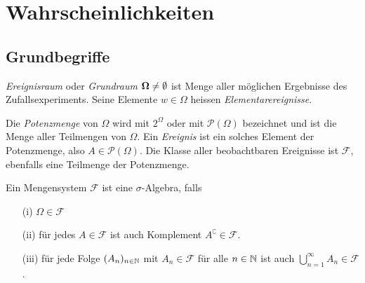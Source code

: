 \setcounter{section}{0} %

\section{Wahrscheinlichkeiten}
\subsection{Grundbegriffe}
\begin{definition}
\textit{Ereignisraum} oder \textit{Grundraum} $\boldsymbol{\Omega} \neq \emptyset$ ist Menge aller möglichen Ergebnisse des Zufallsexperiments. Seine Elemente $w\in \Omega$ heissen \textit{Elementarereignisse}.
\end{definition} 

\begin{definition}
Die \textit{Potenzmenge} von $\Omega$ wird mit $2^\Omega$ oder mit $\mathcal{P}(\Omega)$ bezeichnet und ist die Menge aller Teilmengen von $\Omega$. Ein \textit{Ereignis} ist ein solches Element der Potenzmenge, also $A\in\mathcal{P}(\Omega)$. Die Klasse aller beobachtbaren Ereignisse ist $\mathcal{F}$, ebenfalls eine Teilmenge der Potenzmenge.
\end{definition}

\begin{definition}
Ein Mengensystem $\mathcal{F}$ ist eine $\sigma$-Algebra, falls
\begin{itemize}
\item[(i)] $\Omega \in \mathcal{F}$
\item[(ii)] für jedes $A\in\mathcal{F}$ ist auch Komplement $A^\complement \in \mathcal{F}$. 
\item[(iii)] für jede Folge $(A_n)_{n\in\mathbb{N}}$ mit $A_n \in \mathcal{F}$ für alle $n\in \mathbb{N}$ ist auch $\bigcup_{n=1}^\infty A_n \in \mathcal{F}$.
\end{itemize}
\end{definition}

